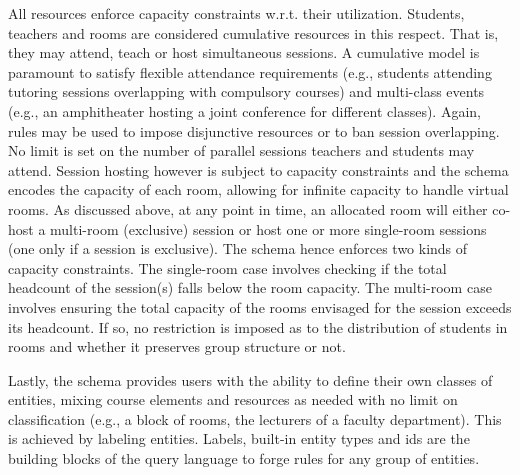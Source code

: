 All resources enforce capacity constraints w.r.t. their utilization.
Students, teachers and rooms are considered cumulative resources in this respect.
That is, they may attend, teach or host simultaneous sessions.
A cumulative model is paramount 
to satisfy flexible attendance requirements
(e.g., students attending tutoring sessions overlapping with compulsory courses)
and multi-class events 
(e.g., an amphitheater hosting %
a joint conference for different classes).
Again, rules may be used to impose disjunctive resources 
or to ban session overlapping.
%
No limit is set on the number of parallel sessions teachers and students may attend.
Session hosting however is subject to capacity constraints
and the schema encodes the capacity of each room,
allowing for infinite capacity to handle virtual rooms. %
As discussed above, 
at any point in time, 
an allocated room will
either 
co-host a multi-room (exclusive) session
or host one or more single-room sessions (one only if a session is exclusive).
The schema hence enforces two kinds of capacity constraints.
The single-room case involves checking
if the total headcount of the session(s) falls below the room capacity.
The multi-room case involves
ensuring the total capacity of the rooms envisaged for the session exceeds its headcount.
If so, 
no restriction is imposed as to the distribution of students in rooms
and whether it preserves group structure or not.

Lastly, the schema provides users with the ability to define their own classes of entities,
mixing course elements and resources as needed
with no limit on classification
(e.g., a block of rooms, the lecturers of a faculty department).
This is achieved by labeling entities.
Labels, built-in entity types and ids
are the building blocks of the query language
to forge rules for any group of entities.



